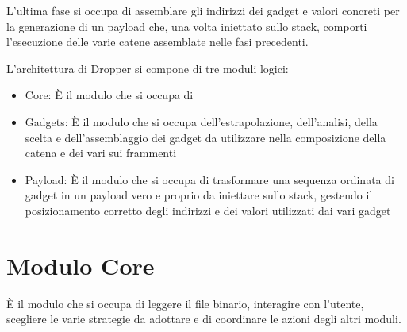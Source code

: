 L'ultima fase si occupa di assemblare gli indirizzi dei gadget e
valori concreti per la generazione di un payload che, una volta
iniettato sullo stack, comporti l'esecuzione delle varie catene
assemblate nelle fasi precedenti.


L'architettura di Dropper si compone di tre moduli logici:

\begin{itemize}

  \item Core: È il modulo che si occupa di 
  \item Gadgets: È il modulo che si occupa dell'estrapolazione,
    dell'analisi, della scelta e dell'assemblaggio dei gadget da utilizzare nella
    composizione della catena e dei vari sui frammenti

  \item Payload: È il modulo che si occupa di trasformare una
    sequenza ordinata di gadget in un payload vero e proprio da
    iniettare sullo stack, gestendo il posizionamento corretto degli
    indirizzi e dei valori utilizzati dai vari gadget

\end{itemize}

\section{Modulo Core}
\label{sec:arc:core}

È il modulo che si occupa di leggere il file binario, interagire con
l'utente, scegliere le varie strategie da adottare e di coordinare le
azioni degli altri moduli. 

